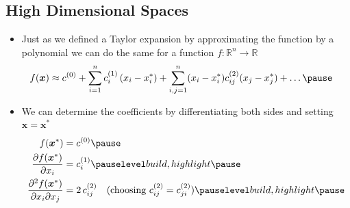 \begin{slide}
\section[-2]{High Dimensional Spaces}

\begin{PauseHighLight}
  \begin{itemize}
  \item Just as we defined a Taylor expansion by approximating the
    function by a polynomial we can do the same for a function
    $f:\mathbb{R}^n \rightarrow \mathbb{R}$
    \begin{align*}
      f(\bm{x}) &\approx c^{(0)} + \sum_{i=1}^n c^{(1)}_i \, (x_i - x_i^*)
      + \sum_{i,j=1}^n (x_i-x_i^*) c^{(2)}_{ij} (x_j-x^*_j) + \ldots
                  \pause
    \end{align*}
  \item We can determine the coefficients by differentiating both
    sides and setting $\bm{x} = \bm{x}^*$
    \begin{align*}
      f(\bm{x}^*) &= c^{(0)} \pause\\
      \frac{\partial f(\bm{x}^*)}{\partial x_i} &= c^{(1)}_i \pauseb\\
      \frac{\partial^2 f(\bm{x}^*)}{\partial x_i\partial x_j} &= 2\,c^{(2)}_{ij}
      \quad\text{(choosing $c^{(2)}_{ij} = c^{(2)}_{ji}$)}\pauseb
    \end{align*}
  \end{itemize}
\end{PauseHighLight}

\end{slide}


